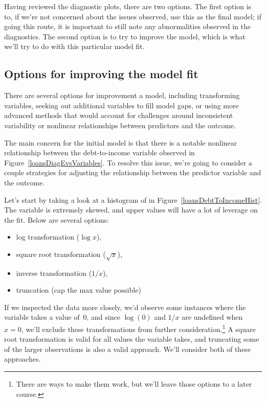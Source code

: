 Having reviewed the diagnostic plots, there are two options.
The first option is to, if we're not concerned about the issues
observed, use this as the final model;
if going this route, it is important to still note any
abnormalities observed in the diagnostics.
The second option is to try to improve the model,
which is what we'll try to do with this particular model fit.



\subsection{Options for improving the model fit}

There are several options for improvement a model,
including transforming variables,
seeking out additional variables to fill model gaps,
or using more advanced methods that would account for
challenges around inconsistent variability or nonlinear
relationships between predictors and the outcome.

The main concern for the initial model is that
there is a notable nonlinear relationship
between the debt-to-income variable observed in
Figure~\ref{loansDiagEvsVariables}.
To resolve this issue, we're going to consider
a couple strategies for adjusting the relationship
between the predictor variable and the outcome.

Let's start by taking a look at a histogram of
 in
Figure~\ref{loansDebtToIncomeHist}.
The variable is extremely skewed,
and upper values will have a lot of leverage
on the fit.
Below are several options:
\begin{itemize}
\item log transformation ($\log{x}$),
\item square root transformation ($\sqrt{x}$),
\item inverse transformation ($1 / x$),
\item truncation (cap the max value possible)
\end{itemize}
If we inspected the data more closely, we'd observe
some instances where the variable takes a value of~0,
and since $\log(0)$ and $1 / x$ are undefined when $x = 0$,
we'll exclude these transformations from further
consideration.\footnote{There are ways to make them work,
   but we'll leave those options to a later course.}
A square root transformation is valid for all values
the variable takes, and truncating some of the larger
observations is also a valid approach.
We'll consider both of these approaches.

